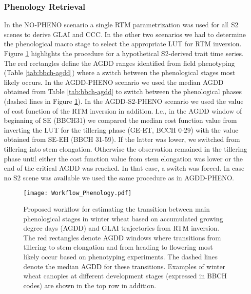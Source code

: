 \subsubsection{Phenology Retrieval}
\label{subsubsec:pheno-from-s2}
In the NO-PHENO scenario a single \gls{RTM} parametrization was used for all \gls{S2} scenes to derive \gls{GLAI} and CCC. In the other two scenarios we had to determine the phenological macro stage to select the appropriate \gls{LUT} for \gls{RTM} inversion. Figure \ref{fig:workflow-phenology} highlights the procedure for a hypothetical S2-derived trait time series. The red rectangles define the AGDD ranges identified from field phenotyping (Table \ref{tab:bbch-agdd}) where a switch between the phenological stages most likely occurs. In the AGDD-PHENO scenario we used the median AGDD obtained from Table \ref{tab:bbch-agdd} to switch between the phenological phases (dashed lines in Figure \ref{fig:workflow-phenology}). In the AGDD-S2-PHENO scenario we used the value of cost function of the \gls{RTM} inversion in addition. I.e., in the AGDD window of beginning of SE (BBCH31) we compared the median cost function value from inverting the \gls{LUT} for the tillering phase (GE-ET, BCCH 0-29) with the value obtained from SE-EH (BBCH 31-59). If the latter was lower, we switched from tillering into stem elongation. Otherwise the observation remained in the tillering phase until either the cost function value from stem elongation was lower or the end of the critical AGDD was reached. In that case, a switch was forced. In case no \gls{S2} scene was available we used the same procedure as in AGDD-PHENO.

\begin{figure}[H]
    \centering
    \texttt{[image: Workflow\_Phenology.pdf]}
    \caption[Proposed workflow for estimating the transition between main phenological stages in winter wheat based on accumulated growing degree days (AGDD) and \gls{GLAI} trajectories from \gls{RTM} inversion. The red rectangles denote AGDD windows where transitions from tillering to stem elongation and from heading to flowering most likely occur based on phenotyping experiments. The dashed lines denote the median AGDD for these transitions. Examples of winter wheat canopies at different development stages (expressed in BBCH codes) are shown in the top row in addition.]{Proposed workflow for estimating the transition between main phenological stages in winter wheat based on accumulated growing degree days (AGDD) and \gls{GLAI} trajectories from \gls{RTM} inversion. The red rectangles denote AGDD windows where transitions from tillering to stem elongation and from heading to flowering most likely occur based on phenotyping experiments. The dashed lines denote the median AGDD for these transitions. Examples of winter wheat canopies at different development stages (expressed in BBCH codes) are shown in the top row in addition.}
    \label{fig:workflow-phenology}
\end{figure}

